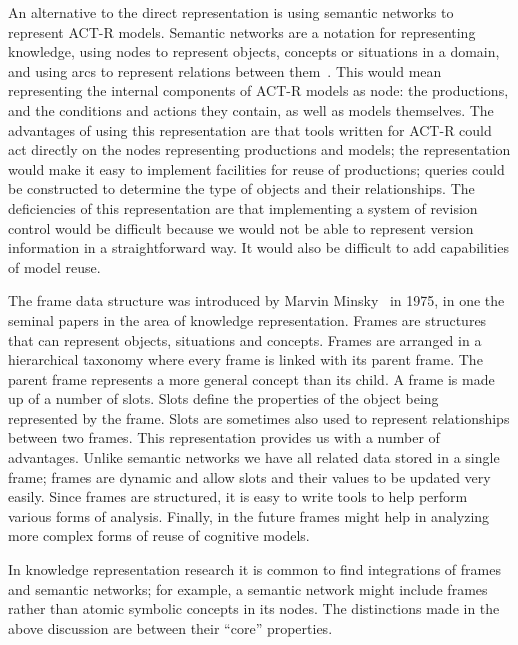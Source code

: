 An alternative to the direct representation is using semantic networks
to represent ACT-R models. Semantic networks are a notation for
representing knowledge, using nodes to represent objects, concepts or
situations in a domain, and using arcs to represent relations between
them~\cite{Sowa87,Barr81}. This would mean representing the internal
components of ACT-R models as node: the productions, and the
conditions and actions they contain, as well as models themselves.
The advantages of using this representation are that tools written for
ACT-R could act directly on the nodes representing productions and
models; the representation would make it easy to implement facilities
for reuse of productions; queries could be constructed to determine
the type of objects and their relationships. The deficiencies of this
representation are that implementing a system of revision control
would be difficult because we would not be able to represent version
information in a straightforward way.  It would also be difficult to
add capabilities of model reuse.


The frame data structure was introduced by Marvin
Minsky~\cite{Minsky1974a} in 1975, in one the seminal papers in the
area of knowledge representation. Frames are structures that can
represent objects, situations and concepts. Frames are arranged in a
hierarchical taxonomy where every frame is linked with its parent
frame. The parent frame represents a more general concept than its
child\cite{karp-93}. A frame is made up of a number of slots. Slots
define the properties of the object being represented by the
frame. Slots are sometimes also used to represent relationships
between two frames. This representation provides us with a number of
advantages.  Unlike semantic networks we have all related data stored
in a single frame; frames are dynamic and allow slots and their values
to be updated very easily.  Since frames are structured, it is easy to
write tools to help perform various forms of analysis.  Finally, in
the future frames might help in analyzing more complex forms of reuse
of cognitive models.

In knowledge representation research it is common to find integrations
of frames and semantic networks; for example, a semantic network might
include frames rather than atomic symbolic concepts in its nodes.  The
distinctions made in the above discussion are between their ``core''
properties.

